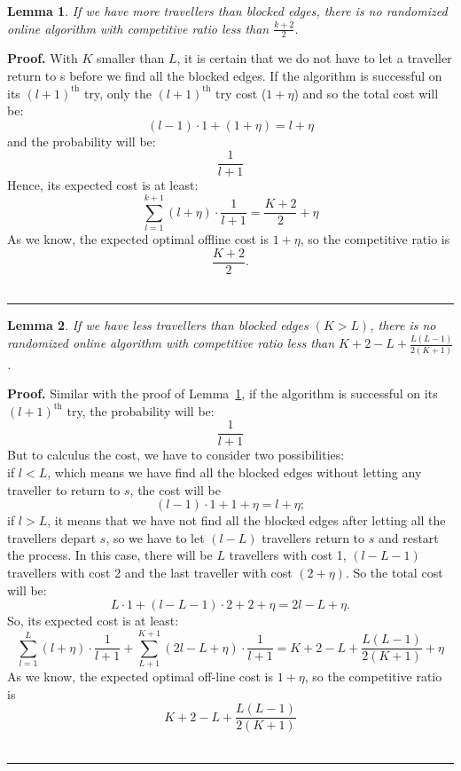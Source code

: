 \documentclass[letter-size, 11pt]{article}
\newtheorem{lemma}{Lemma}
\newenvironment{proof}[1][Proof]{\textbf{#1.} }{\ \rule{0.5em}{0.5em}}
\begin{document}
\begin{lemma}
If we have more travellers than blocked edges, there is no randomized online algorithm with competitive ratio less than $\frac{k+2}{2}$.
\label{lemma_moretr}
\end{lemma}

\begin{proof} 
With $K$ smaller than $L$, it is certain that we do not have to let a traveller return to s before we find all the blocked edges. If the algorithm is successful on its $(l+1)^{\text{th}}$ try, only the $(l+1)^{\text{th}}$ try cost ($1+ \eta$) and so the total cost will be:
\[
(l-1)\cdot 1 + (1+\eta) = l+\eta
\]
and the probability will be: 
\[
\frac{1}{l+1}
\]
Hence, its expected cost is at least:
\[
\sum_{l=1}^{k+1}(l+\eta)\cdot \frac{1}{l+1} = \frac{K+2}{2}+\eta
\]
As we know, the expected optimal offline cost is $1 + \eta$, so the competitive ratio is 
\[
\frac{K+2}{2} .
\]
\end{proof}

\begin{lemma}
If we have less travellers than blocked edges $ (K > L )$, there is no randomized online algorithm with competitive ratio less than $
K+2-L+ \frac{L(L-1)}{2(K+1)}$.
\end{lemma}

\begin{proof}
Similar with the proof of Lemma~\ref{lemma_moretr}, if the algorithm is successful on its $(l+1)^{\text{th}}$ try, the probability will be: 
\[
\frac{1}{l+1}
\]
But to calculus the cost, we have to consider two possibilities: 
\\if $l < L$, which means we have find all the blocked edges without letting any traveller to return to $s$, the cost will be 
\[
(l-1)\cdot1 + 1 +\eta = l + \eta;
\]
if $l > L$, it means that we have not find all the blocked edges after letting all the travellers depart $s$,  so we have to let $(l-L)$ travellers return to $s$ and restart the process. In this case, there will be $L$ travellers with cost 1, $(l-L-1)$ travellers with cost 2 and the last traveller with cost $(2+\eta)$. So the total cost will be:
\[
L\cdot 1 + (l-L-1)\cdot2 + 2 +\eta = 2l - L + \eta .
\]
So, its expected cost is at least:
\[
\sum_{l=1}^{L}(l+\eta)\cdot \frac{1}{l+1}  +  \sum_{L+1}^{K+1}(2l-L+\eta)\cdot \frac{1}{l+1}
 =K+2-L+ \frac{L(L-1)}{2(K+1)} + \eta
\]
As we know, the expected optimal off-line cost is $1 + \eta$, so the competitive ratio is 
\[
K+2-L+ \frac{L(L-1)}{2(K+1)}
\]
\end{proof}
\end{document}
